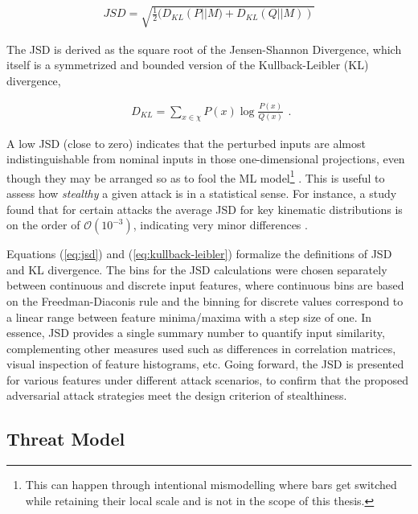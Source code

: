 \begin{equation}
\begin{split}
JSD = \sqrt{\frac{1}{2} ( D_{KL}\left( P \vert\vert M)+D_{KL}(Q \vert\vert M)\right)}
\end{split}
\label{eq:jsd}
\end{equation}

The JSD is derived as the square root of the Jensen-Shannon Divergence, which itself is a symmetrized and bounded version of the Kullback-Leibler (KL) divergence,

\begin{equation}
\begin{split}
D_{KL}=\sum_{x\in\chi} P(x) \log{\frac{P(x)}{Q(x)}}
\end{split}
\label{eq:kullback-leibler}.
\end{equation}

A low JSD (close to zero) indicates that the perturbed inputs are almost indistinguishable from nominal inputs in those one-dimensional projections, even though they may be arranged so as to fool the ML  model\footnote{This can happen through intentional mismodelling where bars get switched while retaining their local scale and is not in the scope of this thesis.} \cite{saala2025enforcingfundamentalrelationsadversarial}. This is useful to assess how \textit{stealthy} a given attack is in a statistical sense. For instance, a study found that for certain attacks the average JSD for key kinematic distributions is on the order of $\mathcal{O}(10^{-3})$, indicating very minor differences \cite{saala2025enforcingfundamentalrelationsadversarial}. 

Equations (\ref{eq:jsd}) and (\ref{eq:kullback-leibler}) formalize the definitions of JSD and KL divergence. The bins for the JSD calculations were chosen separately between continuous and discrete input features, where continuous bins are based on the Freedman-Diaconis rule \cite{Freedman1981} and the binning for discrete values correspond to a linear range between feature minima/maxima with a step size of one. In essence, JSD provides a single summary number to quantify input similarity, complementing other measures used such as differences in correlation matrices, visual inspection of feature histograms, etc. Going forward, the JSD is presented for various features under different attack scenarios, to confirm that the proposed adversarial attack strategies meet the design criterion of stealthiness.

\subsection*{Threat Model}

